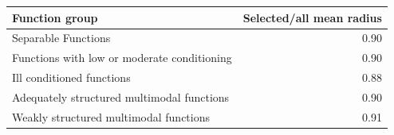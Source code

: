\begin{tabular}{lr}
\toprule
Function group & Selected/all mean radius \\
\midrule
Separable Functions & 0.90 \\
Functions with low or moderate conditioning & 0.90 \\
Ill conditioned functions & 0.88 \\
Adequately structured multimodal functions & 0.90 \\
Weakly structured multimodal functions & 0.91 \\
\bottomrule
\end{tabular}
